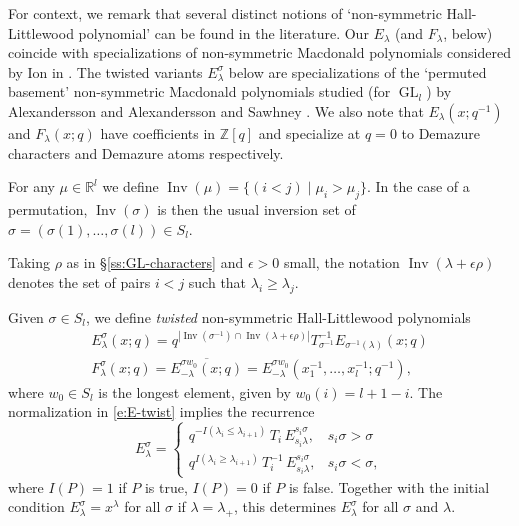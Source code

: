 \documentclass[12pt]{amsart}
\theoremstyle{definition}
\theoremstyle{remark}
\newcommand{\RR}{{\mathbb R}}
\newcommand{\ZZ}{{\mathbb Z}}
\DeclareMathOperator{\Inv}{Inv}
\DeclareMathOperator{\GL}{GL}
\begin{document}
For context, we remark that several distinct notions of `non-symmetric
Hall-Littlewood polynomial' can be found in the literature.  Our
$E_{\lambda }$ (and $F_\lambda $, below) coincide with specializations
of non-symmetric Macdonald polynomials considered by Ion in
\cite[Theorem 4.8]{Ion08}.  The twisted variants $E_\lambda ^\sigma$
below are specializations of the `permuted basement' non-symmetric
Macdonald polynomials studied (for $\GL _{l}$) by Alexandersson
\cite{Alexandersson19} and Alexandersson and Sawhney
\cite{AlexSawh19}.
We also note that $E_\lambda(x;q^{-1})$ and $F_\lambda(x;q)$
have coefficients in $\ZZ[q]$ and specialize at $q=0$ to Demazure
characters and Demazure atoms respectively.


For any $\mu \in \RR ^{l}$ we define $\Inv (\mu ) = \{(i<j)\mid \mu
_{i}>\mu _{j} \}$.  In the case of a permutation, $\Inv (\sigma )$ is
then the usual inversion set of $\sigma =(\sigma (1),\ldots,\sigma
(l)) \in S_l$.

Taking $\rho $ as in \S \ref{ss:GL-characters} and $\epsilon >0$
small, the notation $\Inv (\lambda +\epsilon \rho )$ denotes the set
of pairs $i<j$ such that $\lambda _{i}\geq \lambda _{j}$.

Given $\sigma \in S_{l}$, we define {\em twisted} non-symmetric
Hall-Littlewood polynomials
\begin{gather}\label{e:E-twist}
E^{\sigma }_{\lambda }(x;q) = q^{|\Inv (\sigma ^{-1})\cap \Inv
(\lambda +\epsilon \rho )|} T_{\sigma ^{-1}}^{-1} E_{\sigma
^{-1}(\lambda
)}(x;q)\\
\label{e:F-twist}
F^{\sigma }_{\lambda }(x;q) = \overline{E^{\sigma w_{0}}_{-\lambda
}(x;q)} = E^{\sigma w_{0}}_{-\lambda
}(x_{1}^{-1},\ldots,x_{l}^{-1};q^{-1}),
\end{gather}
where $w_{0}\in S_{l}$ is the longest element, given by $w_{0}(i) =
l+1-i$. The normalization in \eqref{e:E-twist} implies the recurrence
\begin{equation}\label{e:E-recurrence}
E^{\sigma }_{\lambda } =
\begin{cases}
q^{-I(\lambda _{i}\leq \lambda _{i+1})}\, T_{i}\, E^{s_{i}\sigma
}_{s_{i}\lambda },
 &	  s_{i}\sigma >\sigma \\
q^{I(\lambda _{i}\geq \lambda _{i+1})}\, T_{i}^{-1}\, E^{s_{i}\sigma
}_{s_{i}\lambda }, & s_{i}\sigma <\sigma,
\end{cases}
\end{equation}
where $I(P)=1$ if $P$ is true, $I(P)=0$ if $P$ is false.  
Together
with the initial condition $E^{\sigma }_{\lambda } = x^{\lambda }$ for
all $\sigma $ if $\lambda =\lambda _{+}$, this determines $E^{\sigma
}_{\lambda }$ for all $\sigma $ and $\lambda $.
\end{document}
